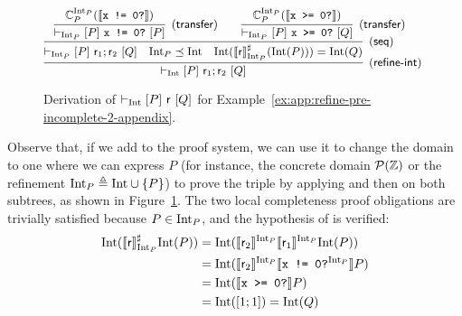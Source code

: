 \begin{example}
	\begin{figure*}[t]
		\[
		\text{\small
			\infer[(\mathsf{refine\mbox{-}int})]
			{\lcl{\Int}{P}{\regr_1; \regr_2}{Q}}
			{\infer[(\mathsf{seq})]
				{\lcl{\Int_P}{P}{\regr_1; \regr_2}{Q} \quad \Int_P \preceq \Int \quad \Int(\denot{\regr}^{\sharp}_{\Int_P}(\Int(P))) = \Int(Q)}
				{
					\infer[(\mathsf{transfer})]
					{\lcl{\Int_P}{P}{\code{x != 0?}}{P}}{ \complete{\Int_P}{P}{\denot{\code{x != 0?}}} }
					& &
					\infer[(\mathsf{transfer})]
					{\lcl{\Int_P}{P}{\code{x >= 0?}}{Q}}{ \complete{\Int_P}{P}{\denot{\code{x >= 0?}}} }
				}
			}
		}
		\]
		\caption{Derivation of $\vdash_{\text{Int}}\nobreak[P]~\mathsf{r}~[Q]$ for Example~\ref{ex:app:refine-pre-incomplete-2-appendix}.}\label{fig:app:ex-refine-int-incomplete-2}
	\end{figure*}

	Observe that, if we add  to the proof system, we can use it to change the domain to one where we can express $P$ (for instance, the concrete domain $\mathcal{P}(\mathbb{Z})$ or the refinement $\text{Int}_P \triangleq \text{Int} \cup \{ P \}$) to prove the triple by applying  and then  on both subtrees, as shown in Figure~\ref{fig:app:ex-refine-int-incomplete-2}.
	The two local completeness proof obligations are trivially satisfied because $P \in \text{Int}_P$, and the hypothesis of  is verified:
	\begin{align*}
		\text{Int}( \llbracket\mathsf{r}\rrbracket^{\sharp}_{\text{Int}_P} \text{Int}(P)) &= \text{Int}( \llbracket\mathsf{r}_2\rrbracket^{\text{Int}_P} \llbracket\mathsf{r}_1\rrbracket^{\text{Int}_P} \text{Int}(P)) \\
		&= \text{Int}( \llbracket\mathsf{r}_2\rrbracket^{\text{Int}_P} \llbracket\texttt{x != 0?}^{\text{Int}_P}\rrbracket P) \\
		&= \text{Int}( \llbracket\texttt{x >= 0?}\rrbracket P) \\
		&= \text{Int}( [1; 1] ) = \text{Int}(Q)
	\end{align*}
\end{example}

